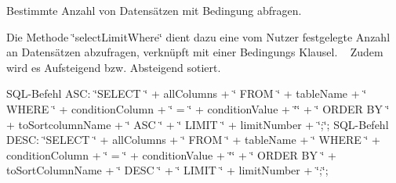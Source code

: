 Bestimmte Anzahl von Datensätzen mit Bedingung abfragen. 

Die Methode \char`\"{}select\+Limit\+Where\char`\"{} dient dazu eine vom Nutzer festgelegte Anzahl an Datensätzen abzufragen, verknüpft mit einer Bedingungs Klausel. ~\newline
 Zudem wird es Aufsteigend bzw. Absteigend sotiert.~\newline


S\+Q\+L-\/\+Befehl A\+SC\+: \char`\"{}\+S\+E\+L\+E\+C\+T \char`\"{} + all\+Columns + \char`\"{} F\+R\+O\+M \char`\"{} + table\+Name + \char`\"{} W\+H\+E\+R\+E \char`\"{} + condition\+Column + \char`\"{} = \textquotesingle{}\char`\"{} + condition\+Value + \char`\"{}\textquotesingle{}\char`\"{} + \char`\"{}  O\+R\+D\+E\+R B\+Y \char`\"{} + to\+Sortcolumn\+Name + \char`\"{} A\+S\+C \char`\"{} + \char`\"{} L\+I\+M\+I\+T \char`\"{} + limit\+Number + \char`\"{};\char`\"{}; S\+Q\+L-\/\+Befehl D\+E\+SC\+: \char`\"{}\+S\+E\+L\+E\+C\+T \char`\"{} + all\+Columns + \char`\"{} F\+R\+O\+M \char`\"{} + table\+Name + \char`\"{} W\+H\+E\+R\+E \char`\"{} + condition\+Column + \char`\"{} = \textquotesingle{}\char`\"{} + condition\+Value + \char`\"{}\textquotesingle{}\char`\"{} + \char`\"{}  O\+R\+D\+E\+R B\+Y \char`\"{} + to\+Sort\+Column\+Name + \char`\"{} D\+E\+S\+C \char`\"{} + \char`\"{} L\+I\+M\+I\+T \char`\"{} + limit\+Number + \char`\"{};\char`\"{};


